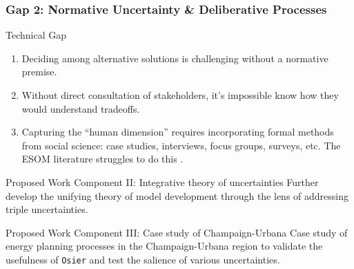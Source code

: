 

\begin{frame}
    \frametitle{Gap 2: Normative Uncertainty \& Deliberative Processes}
    \begin{block}{Technical Gap}
        \begin{enumerate}
            \item Deciding among alternative solutions is challenging without a normative premise.
            \item Without direct consultation of stakeholders, it's impossible know how they would understand tradeoffs.
            \item Capturing the ``human dimension'' requires incorporating formal methods from social science: case studies,
            interviews, focus groups, surveys, etc. The ESOM literature struggles to do this \cite{pfenninger_energy_2014}.
        \end{enumerate}
    \end{block}
    \begin{block}{Proposed Work Component II: Integrative theory of uncertainties}
        Further develop the unifying theory of model development through the lens of 
        addressing triple uncertainties.
    \end{block}
    \begin{block}{Proposed Work Component III: Case study of Champaign-Urbana}
        Case study of energy planning processes in the Champaign-Urbana region to validate
        the usefulness of \texttt{Osier} and test the salience of various uncertainties.
    \end{block}
    
\end{frame}